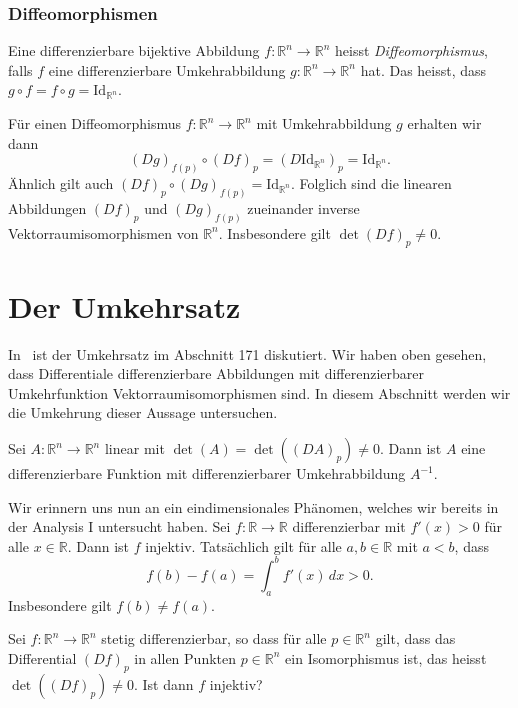 \documentclass[../main.tex]{subfiles}
\begin{document}
\subsubsection*{Diffeomorphismen}
\begin{definition}
  Eine differenzierbare bijektive Abbildung
  $f \colon \mathbb{R}^n \to \mathbb{R}^n$
  heisst \emph{Diffeomorphismus}, falls $f$
  eine differenzierbare Umkehrabbildung $g \colon \mathbb{R}^n \to \mathbb{R}^n$
  hat.
  Das heisst, dass $g \circ f = f \circ g = \text{Id}_{\mathbb{R}^n}$.
\end{definition}

Für einen Diffeomorphismus $f \colon \mathbb{R}^n \to \mathbb{R}^n$
mit Umkehrabbildung $g$ erhalten wir dann
\[
  {(Dg)}_{f(p)} \circ {(Df)}_p
  = {(D \text{Id}_{\mathbb{R}^n})}_p = \text{Id}_{\mathbb{R}^n}.
\]
Ähnlich gilt auch ${(Df)}_p \circ {(Dg)}_{f(p)} = \text{Id}_{\mathbb{R}^n}$.
Folglich sind die linearen Abbildungen
${(Df)}_p$ und ${(Dg)}_{f(p)}$ zueinander
inverse Vektorraumisomorphismen von $\mathbb{R}^n$.
Insbesondere gilt
$\det {(Df)}_p \neq 0$.

\section{Der Umkehrsatz}
In~\cite{heuser} ist der Umkehrsatz im Abschnitt 171 diskutiert.
Wir haben oben gesehen, dass Differentiale differenzierbare Abbildungen
mit differenzierbarer Umkehrfunktion Vektorraumisomorphismen sind.
In diesem Abschnitt werden wir die Umkehrung dieser Aussage
untersuchen.

\begin{example}
  Sei $A \colon \mathbb{R}^n \to \mathbb{R}^n$ linear
  mit $\det(A) = \det({(DA)}_p) \ne 0$.
  Dann ist $A$ eine differenzierbare Funktion
  mit differenzierbarer Umkehrabbildung $A^{-1}$.
\end{example}

Wir erinnern uns nun an ein eindimensionales Phänomen,
welches wir bereits in der Analysis I untersucht haben.
Sei $f \colon \mathbb{R} \to \mathbb{R}$
differenzierbar mit $f'(x) > 0$ für alle $x \in \mathbb{R}$.
Dann ist $f$ injektiv.
Tatsächlich gilt für alle $a, b \in \mathbb{R}$ mit $a < b$,
dass
\[
  f(b) - f(a) = \int_{a}^{b} f'(x) \, dx > 0.
\]
Insbesondere gilt $f(b) \neq f(a)$.

\begin{question}
  Sei $f \colon \mathbb{R}^n \to \mathbb{R}^n$ stetig
  differenzierbar, so dass für alle
  $p \in \mathbb{R}^n$ gilt, dass
  das Differential ${(Df)}_p$ in allen Punkten
  $p \in \mathbb{R}^n$ ein Isomorphismus ist, das heisst
  $\det({(Df)}_p) \neq 0$.
  Ist dann $f$ injektiv?
\end{question}
\end{document}
